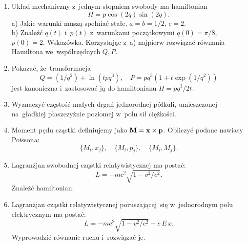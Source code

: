 \documentclass[a4paper,11pt]{article}
\begin{document}
\begin{enumerate}
\item Układ mechaniczny z~jednym stopniem swobody ma hamiltonian
  \begin{equation*}
    H = p \cos( 2q ) \sin( 2q ).
  \end{equation*}
  a) Jakie warunki muszą spełniać stałe, $a = b = 1 / 2$, $c = 2$. \\
  b) Znaleźć $q( t )$ i~$p( t )$ z~warunkami początkowymi
  $q( 0 ) = \pi / 8$, $p( 0 ) = 2$. Wskazówka. Korzystając z~a) najpierw
  rozwiązać równania Hamiltona we~współrzędnych $Q, P$.



\item Pokazać, że~transformacja
  \begin{equation*}
    Q = ( 1 / q^{ 2 } ) + \ln( t p q^{ 3 } ), \quad
    P = p q^{ 3 } ( 1 + t \exp( 1 / q^{ 2 } ) )
  \end{equation*}
  jest kanoniczna i~zastosować ją do hamiltonianu $H = p q^{ 3 } / 2 t$.



\item Wyznaczyć częstość małych drgań jednorodnej półkuli, umieszczonej
  na~gładkiej płaszczyźnie poziomej w~polu sił ciężkości.



\item Moment pędu cząstki definiujemy jako
  $\mathbf{M} = \mathbf{x} \times \mathbf{p}$. Obliczyć podane nawiasy Poissona:
  \begin{equation*}
    \{ M_{ i }, x_{ j } \}, \quad \{ M_{ i }, p_{ j } \}, \quad
    \{ M_{ i }, M_{ j } \}.
  \end{equation*}



\item Lagranżjan swobodnej cząstki relatywistycznej ma postać:
  \begin{equation*}
    L = -m c^{ 2 } \sqrt{ 1 - v^{ 2 } / c^{ 2 } }.
  \end{equation*}
  Znaleźć hamiltonian.



\item Lagranżjan cząstki relatywistycznej poruszającej~się w~jednorodnym
  polu elektrycznym ma postać:
  \begin{equation*}
    L = -m c^{ 2 } \sqrt{ 1 - v^{ 2 } / c^{ 2 } } + e \, E \, x.
  \end{equation*}
  Wyprowadzić równanie ruchu i~rozwiązać je.




\end{enumerate}
\end{document}
